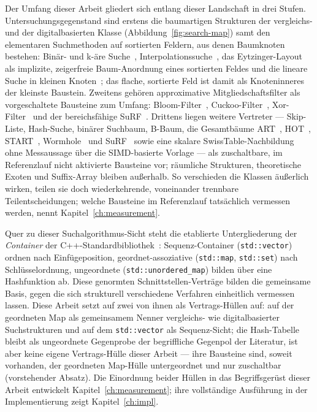 \begin{nurkurz}
Der Umfang dieser Arbeit gliedert sich entlang dieser Landschaft in drei Stufen. Untersuchungsgegenstand sind
erstens die baumartigen Strukturen der vergleichs- und der digitalbasierten Klasse (Abbildung~\ref{fig:search-map})
samt den elementaren Suchmethoden auf sortierten Feldern, aus denen Baumknoten bestehen: Binär- und k-äre
Suche~\cite{knuth1998taocp3,schlegel2009kary}, Interpolationssuche~\cite{perl1978interpolation}, das
Eytzinger-Layout~\cite{khuong2017eytzinger} als implizite, zeigerfreie Baum-Anordnung eines sortierten Feldes und
die lineare Suche in kleinen Knoten~\cite{leis2013art}; das flache, sortierte Feld ist damit als Knoteninneres der
kleinste Baustein. Zweitens gehören approximative Mitgliedschaftsfilter als vorgeschaltete Bausteine zum Umfang:
Bloom-Filter~\cite{bloom1970}, Cuckoo-Filter~\cite{fan2014cuckoo}, Xor-Filter~\cite{graf2020xor} und der
bereichsfähige SuRF~\cite{zhang2018surf}. Drittens liegen weitere Vertreter --- Skip-Liste, Hash-Suche, binärer
Suchbaum, B-Baum, die Gesamtbäume ART~\cite{leis2013art}, HOT~\cite{binna2018hot}, START~\cite{fent2020start},
Wormhole~\cite{wu2019wormhole} und SuRF~\cite{zhang2018surf} sowie eine skalare SwissTable-Nachbildung ohne
Messaussage über die SIMD-basierte Vorlage --- als zuschaltbare, im Referenzlauf nicht aktivierte Bausteine vor;
räumliche Strukturen, theoretische Exoten und Suffix-Array bleiben außerhalb. So verschieden die Klassen äußerlich
wirken, teilen sie doch wiederkehrende, voneinander trennbare Teilentscheidungen; welche Bausteine im Referenzlauf
tatsächlich vermessen werden, nennt Kapitel~\ref{ch:measurement}.
\end{nurkurz}

Quer zu dieser Suchalgorithmus-Sicht steht die etablierte Untergliederung der \emph{Container} der
C++-Standardbibliothek~\cite{iso_cpp}: Sequenz-Container (\texttt{std::vector}) ordnen nach
Einfügeposition, geordnet-assoziative (\texttt{std::map}, \texttt{std::set}) nach Schlüsselordnung,
ungeordnete (\texttt{std::unordered\_map}) bilden über eine Hashfunktion ab. Diese genormten
Schnittstellen-Verträge bilden die gemeinsame Basis, gegen die sich strukturell verschiedene Verfahren
einheitlich vermessen lassen. Diese Arbeit setzt auf zwei von ihnen als Vertrags-Hüllen auf: auf der
geordneten Map als gemeinsamem Nenner vergleichs- wie digitalbasierter Suchstrukturen und auf dem
\texttt{std::vector} als Sequenz-Sicht; die Hash-Tabelle bleibt als ungeordnete Gegenprobe der
begriffliche Gegenpol der Literatur, ist aber keine eigene Vertrags-Hülle dieser Arbeit --- ihre
Bausteine sind, soweit vorhanden, der geordneten Map-Hülle untergeordnet und nur zuschaltbar
(vorstehender Absatz). Die Einordnung beider Hüllen in das Begriffsgerüst dieser Arbeit entwickelt
Kapitel~\ref{ch:measurement}; ihre vollständige Ausführung in der Implementierung zeigt
Kapitel~\ref{ch:impl}.

